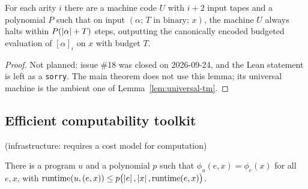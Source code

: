 \begin{lemma}
\label{lem:bounded-universal-machine}
\leanok
For each arity $i$ there are a machine code $U$ with $i + 2$ input tapes and a
polynomial $P$ such that on input $(\alpha;\, T \text{ in binary};\, x)$, the machine
$U$ always halts within $P(\left\vert {\alpha} \right\vert + T)$ steps, outputting the canonically encoded
budgeted evaluation of $[\alpha]_i$ on $x$ with budget $T$.
\end{lemma}

\begin{proof}
Not planned: issue \#18 was closed on 2026-09-24, and the Lean statement is left as a
\texttt{sorry}. The main theorem does not use this lemma; its universal machine is the ambient
one of Lemma~\ref{lem:universal-tm}.
\end{proof}

\subsection{Efficient computability toolkit}
\label{sec:rr-computability}

\effortHard{} (infrastructure: requires a cost model for computation)

\begin{lemma}
\label{lem:universal-tm}
\leanok
There is a program $u$ and a polynomial $p$ such that $\phi_u(e, x) = \phi_e(x)$ for
all $e, x$, with $\mathrm{runtime}(u, (e,x)) \leq
p\bigl(\left\vert {e} \right\vert, \left\vert {x} \right\vert, \mathrm{runtime}(e, x)\bigr)$.
\end{lemma}

